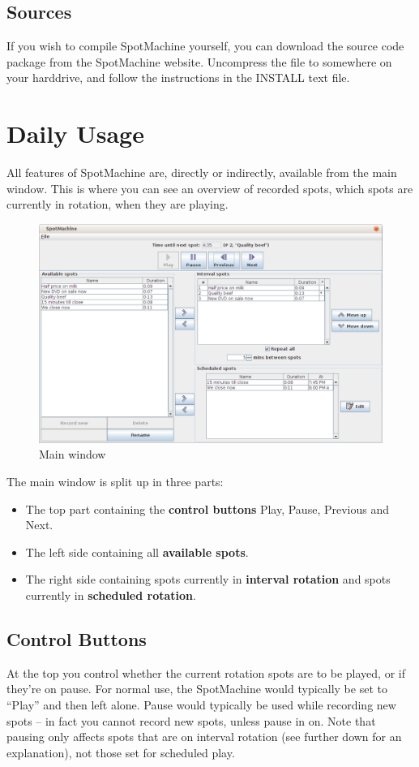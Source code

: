 \documentclass[a4paper,12pt]{report}
\begin{document}
\section{Sources}
If you wish to compile SpotMachine yourself, you can download the source code
package from the SpotMachine website. Uncompress the file to somewhere on your
harddrive, and follow the instructions in the INSTALL text file.

\chapter{Daily Usage}
All features of SpotMachine are, directly or indirectly, available from the main
window. This is where you can see an overview of recorded spots, which spots are
currently in rotation, when they are playing.

\begin{figure}[h]
\centering \includegraphics[width=130mm]{mainwindow.png}
\caption{Main window}
\end{figure}

The main window is split up in three parts:
\begin{itemize}
\item The top part containing the {\bf control buttons} Play, Pause, Previous
      and Next.
\item The left side containing all {\bf available spots}.
\item The right side containing spots currently in {\bf interval rotation} and
      spots currently in {\bf scheduled rotation}.
\end{itemize}

\section{Control Buttons}
At the top you control whether the current rotation spots are to be played, or
if they're on pause. For normal use, the SpotMachine would typically be set to
``Play'' and then left alone. Pause would typically be used while recording new
spots -- in fact you cannot record new spots, unless pause in on. Note that
pausing only affects spots that are on interval rotation (see further down for
an explanation), not those set for scheduled play. %
\end{document}
